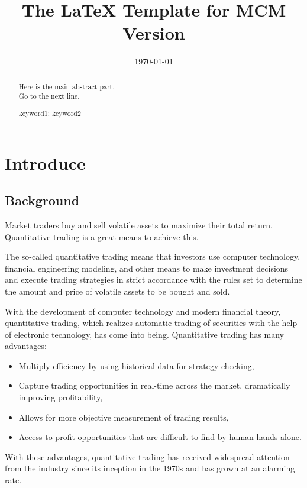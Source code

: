 \documentclass[12pt]{mcmthesis}
\title{The \LaTeX{} Template for MCM Version \MCMversion}  %
\date{\today}
\begin{document}
\begin{abstract}
  Here is the main abstract part. \\ Go to the next line.
  \begin{keywords}
    keyword1; keyword2
  \end{keywords}
\end{abstract}

\maketitle         %
\tableofcontents   %
\newpage


\section{Introduce}
\subsection{Background}

Market traders buy and sell volatile assets to maximize their total return. Quantitative trading is a great means to achieve this.

The so-called quantitative trading means that investors use computer technology, financial engineering modeling, and other means to make investment decisions and execute trading strategies in strict accordance with the rules set to determine the amount and price of volatile assets to be bought and sold.

With the development of computer technology and modern financial theory, quantitative trading, which realizes automatic trading of securities with the help of electronic technology, has come into being. Quantitative trading has many advantages:
\begin{itemize}
  \item Multiply efficiency by using historical data for strategy checking,
  \item Capture trading opportunities in real-time across the market, dramatically improving profitability,
  \item Allows for more objective measurement of trading results,
  \item Access to profit opportunities that are difficult to find by human hands alone.
\end{itemize}
With these advantages, quantitative trading has received widespread attention from the industry since its inception in the 1970s and has grown at an alarming rate.
\end{document}
